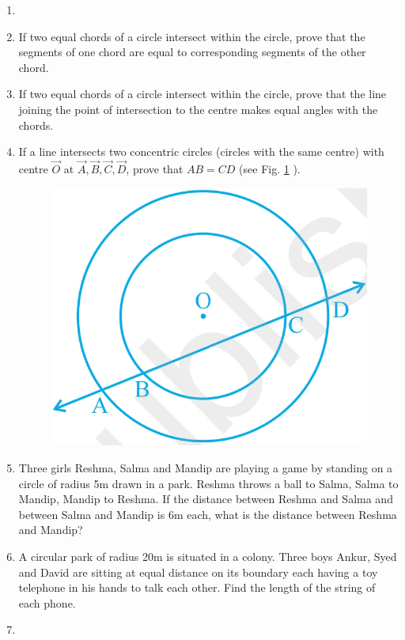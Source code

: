 \begin{enumerate}[label=\thesection.\arabic*,ref=\thesection.\theenumi]
\item 
\label{chapters/9/10/4/1}

\item If two equal chords of a circle intersect within the circle, prove 
that the segments of one chord are equal to corresponding segments of the other 
chord.
\label{chapters/9/10/4/2}
\\
\solution 

\item If two equal chords of a circle intersect within the circle, prove 
that the line joining the point of intersection to the centre makes equal 
angles with the chords.
\\
\solution 
%
\item If a line intersects two concentric circles (circles with the same 
centre) with centre $\vec{O}$ at $\vec{A}, \vec{B}, \vec{C}, \vec{D}$, prove 
that $AB = CD$ (see Fig. 
		\ref{fig:chapters/9/10/41} ).
\begin{figure}[!ht]
    \centering
    \includegraphics[width=\columnwidth]{chapters/9/10/4/figs/fig1.jpg}
    \caption{}
    \label{fig:chapters/9/10/41}
\end{figure}
\item Three girls Reshma, Salma and Mandip are playing a game by standing on 
a circle of radius 5m drawn in a park. Reshma throws a ball to Salma, Salma to 
Mandip, Mandip to Reshma. If the distance between Reshma and Salma and between 
Salma and Mandip is 6m each, what is the distance between Reshma and Mandip?
\item A circular park of radius 20m is situated in a colony. Three boys Ankur,
Syed and David are sitting at equal distance on its boundary each having a toy 
telephone in his hands to talk each other. Find the length of the string of each 
phone.
\item 
\label{chapters/9/10/4/6}



\end{enumerate}

